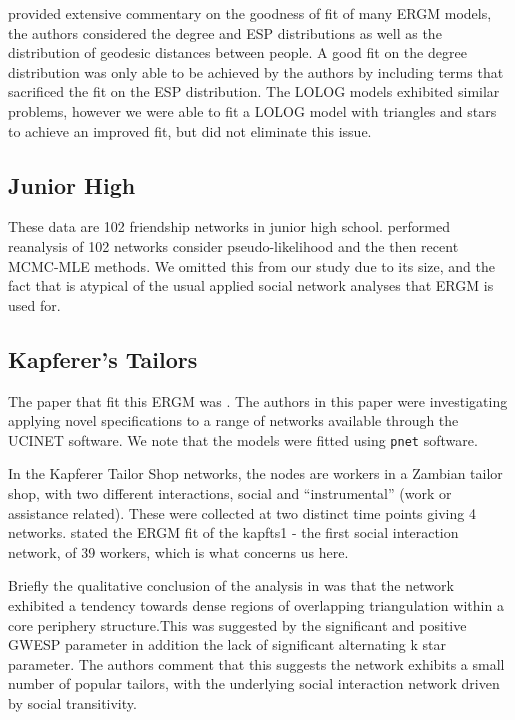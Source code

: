 \documentclass[
]{statsoc}
\begin{document}
\cite{Goodreau2007} provided extensive commentary on the goodness of fit
of many ERGM models, the authors considered the degree and ESP
distributions as well as the distribution of geodesic distances between
people. A good fit on the degree distribution was only able to be
achieved by the authors by including terms that sacrificed the fit on
the ESP distribution. The LOLOG models exhibited similar problems,
however we were able to fit a LOLOG model with triangles and stars to
achieve an improved fit, but did not eliminate this issue.

\subsection{Junior High}

These data are 102 friendship networks in junior high school.
\cite{Lubbers2007} performed reanalysis of 102 networks consider
pseudo-likelihood and the then recent MCMC-MLE methods. We omitted this
from our study due to its size, and the fact that is atypical of the
usual applied social network analyses that ERGM is used for.

\subsection{Kapferer's Tailors}

The paper that fit this ERGM was \cite{Robins2007}. The authors in this
paper were investigating applying novel specifications to a range of
networks available through the UCINET software. We note that the models
were fitted using \texttt{pnet} software.

In the Kapferer Tailor Shop networks, the nodes are workers in a Zambian
tailor shop, with two different interactions, social and
``instrumental'' (work or assistance related). These were collected at
two distinct time points giving 4 networks. \cite{Robins2007} stated the
ERGM fit of the kapfts1 - the first social interaction network, of 39
workers, which is what concerns us here.

Briefly the qualitative conclusion of the analysis in \cite{Robins2007}
was that the network exhibited a tendency towards dense regions of
overlapping triangulation within a core periphery structure.This was
suggested by the significant and positive GWESP parameter in addition
the lack of significant alternating k star parameter. The authors
comment that this suggests the network exhibits a small number of
popular tailors, with the underlying social interaction network driven
by social transitivity.
\end{document}
